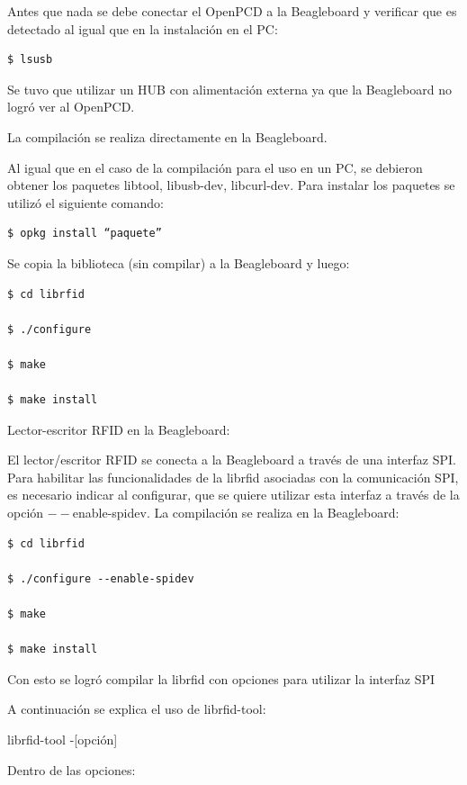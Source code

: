 \bigskip
Antes que nada se debe conectar el OpenPCD a la Beagleboard y verificar que es detectado al igual que en la instalación en el PC:

\begin{verbatim}
$ lsusb
\end{verbatim}

Se tuvo que utilizar un HUB con alimentación externa ya que la Beagleboard no logró ver al OpenPCD.

\bigskip
La compilación se realiza directamente en la Beagleboard.

\bigskip
Al igual que en el caso de la compilación para el uso en un PC, se debieron obtener los paquetes libtool, libusb-dev, libcurl-dev. Para instalar los paquetes se utilizó el siguiente comando:

\begin{verbatim}
$ opkg install “paquete”
\end{verbatim} 

Se copia la biblioteca (sin compilar) a la Beagleboard y luego:

\begin{verbatim}
$ cd librfid

$ ./configure

$ make

$ make install
\end{verbatim}


Lector-escritor RFID en la Beagleboard:

\bigskip
El lector/escritor RFID se conecta a la Beagleboard a través de una interfaz SPI.
Para habilitar las funcionalidades de la librfid asociadas con la comunicación SPI, es necesario indicar al configurar, que se quiere utilizar esta interfaz a través de la opción $--$enable-spidev. La compilación se realiza en la Beagleboard:

\begin{verbatim}
$ cd librfid

$ ./configure --enable-spidev

$ make

$ make install
\end{verbatim}

Con esto se logró compilar la librfid con opciones para utilizar la interfaz SPI

\bigskip
A continuación se explica el uso de librfid-tool:

\bigskip
librfid-tool -[opción]

\bigskip
Dentro de las opciones:

